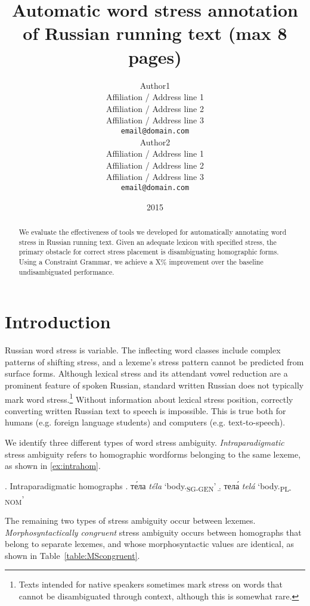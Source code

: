 \documentclass[11pt]{article}
\title{Automatic word stress annotation of Russian running text (max 8 pages)}
\author{Author1 \\
  Affiliation / Address line 1 \\
  Affiliation / Address line 2 \\
  Affiliation / Address line 3 \\
  {\tt email@domain.com} \\\And
  Author2 \\
  Affiliation / Address line 1 \\
  Affiliation / Address line 2 \\
  Affiliation / Address line 3 \\
  {\tt email@domain.com} \\}
\date{2015}
\newcommand{\rus}[1]{\foreignlanguage{russian}{#1}}
\begin{document}
\maketitle
\begin{abstract}
  We evaluate the effectiveness of tools we developed for automatically annotating 
  word stress in Russian running text. Given an adequate lexicon with specified stress, the
  primary obstacle for correct stress placement is disambiguating homographic forms. Using a
  Constraint Grammar, we achieve a X\% improvement over the baseline undisambiguated performance.
\end{abstract}

%

\section{Introduction}

Russian word stress is variable. The inflecting word classes include complex patterns of
shifting stress, and a lexeme's stress pattern cannot be predicted from surface forms.
Although lexical stress and its attendant vowel reduction are a prominent feature of
spoken Russian, standard written Russian does not typically mark word stress.\footnote{
Texts intended for native speakers sometimes mark stress on words that cannot be 
disambiguated through context, although this is somewhat rare.} Without information about lexical 
stress position, 
correctly converting written Russian text to speech is impossible. This is true both for humans
(e.g. foreign language students) and computers (e.g. text-to-speech).

We identify three different types of word stress ambiguity. \emph{Intraparadigmatic}
stress ambiguity refers
to homographic wordforms belonging to the same lexeme, as shown in \ref{ex:intrahom}. 

\ex. Intraparadigmatic homographs \label{ex:intrahom}
\a. \rus{т\'{е}ла} \emph{t\'{e}la} `body.\textsubscript{SG-GEN}' \label{ex:bodySGGEN}
\b. \rus{тел\'{а}} \emph{tel\'{a}} `body.\textsubscript{PL-NOM}' \label{ex:bodyPLNOM}

The remaining two types of stress ambiguity occur between lexemes. \emph{Morphosyntactically
congruent} stress ambiguity occurs between homographs that belong to separate lexemes, 
and whose morphosyntactic values are identical, as shown in Table~\ref{table:MScongruent}. 
\end{document}
